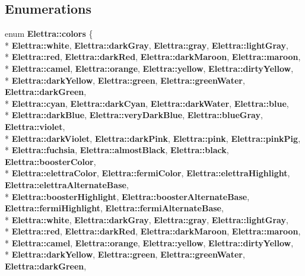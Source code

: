 \subsection*{Enumerations}
\begin{DoxyCompactItemize}
\item 
enum {\bf Elettra\+::colors} \{ \\*
{\bf Elettra\+::white}, 
{\bf Elettra\+::dark\+Gray}, 
{\bf Elettra\+::gray}, 
{\bf Elettra\+::light\+Gray}, 
\\*
{\bf Elettra\+::red}, 
{\bf Elettra\+::dark\+Red}, 
{\bf Elettra\+::dark\+Maroon}, 
{\bf Elettra\+::maroon}, 
\\*
{\bf Elettra\+::camel}, 
{\bf Elettra\+::orange}, 
{\bf Elettra\+::yellow}, 
{\bf Elettra\+::dirty\+Yellow}, 
\\*
{\bf Elettra\+::dark\+Yellow}, 
{\bf Elettra\+::green}, 
{\bf Elettra\+::green\+Water}, 
{\bf Elettra\+::dark\+Green}, 
\\*
{\bf Elettra\+::cyan}, 
{\bf Elettra\+::dark\+Cyan}, 
{\bf Elettra\+::dark\+Water}, 
{\bf Elettra\+::blue}, 
\\*
{\bf Elettra\+::dark\+Blue}, 
{\bf Elettra\+::very\+Dark\+Blue}, 
{\bf Elettra\+::blue\+Gray}, 
{\bf Elettra\+::violet}, 
\\*
{\bf Elettra\+::dark\+Violet}, 
{\bf Elettra\+::dark\+Pink}, 
{\bf Elettra\+::pink}, 
{\bf Elettra\+::pink\+Pig}, 
\\*
{\bf Elettra\+::fuchsia}, 
{\bf Elettra\+::almost\+Black}, 
{\bf Elettra\+::black}, 
{\bf Elettra\+::booster\+Color}, 
\\*
{\bf Elettra\+::elettra\+Color}, 
{\bf Elettra\+::fermi\+Color}, 
{\bf Elettra\+::elettra\+Highlight}, 
{\bf Elettra\+::elettra\+Alternate\+Base}, 
\\*
{\bf Elettra\+::booster\+Highlight}, 
{\bf Elettra\+::booster\+Alternate\+Base}, 
{\bf Elettra\+::fermi\+Highlight}, 
{\bf Elettra\+::fermi\+Alternate\+Base}, 
\\*
{\bf Elettra\+::white}, 
{\bf Elettra\+::dark\+Gray}, 
{\bf Elettra\+::gray}, 
{\bf Elettra\+::light\+Gray}, 
\\*
{\bf Elettra\+::red}, 
{\bf Elettra\+::dark\+Red}, 
{\bf Elettra\+::dark\+Maroon}, 
{\bf Elettra\+::maroon}, 
\\*
{\bf Elettra\+::camel}, 
{\bf Elettra\+::orange}, 
{\bf Elettra\+::yellow}, 
{\bf Elettra\+::dirty\+Yellow}, 
\\*
{\bf Elettra\+::dark\+Yellow}, 
{\bf Elettra\+::green}, 
{\bf Elettra\+::green\+Water}, 
{\bf Elettra\+::dark\+Green}, 

\end{DoxyCompactItemize}
